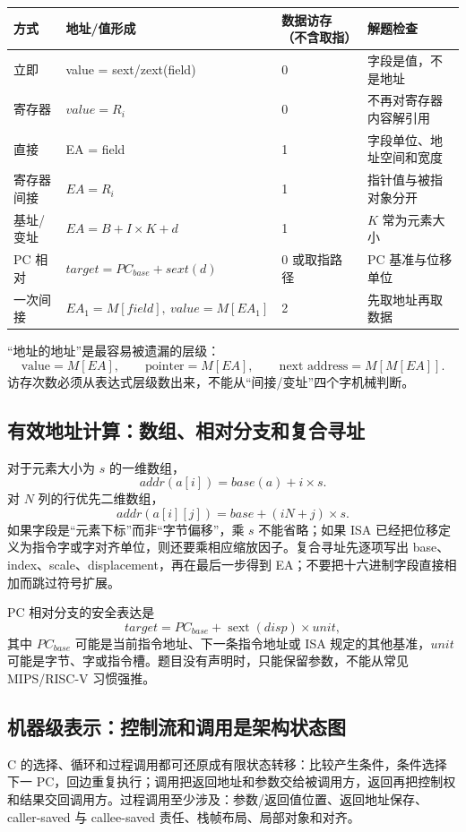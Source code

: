 \documentclass[UTF8,fontset=fandol,11pt,a4paper]{ctexart}
\begin{document}
\begin{center}\small
\begin{tabularx}{\linewidth}{L{2.2cm}L{3.3cm}C{1.0cm}Y}
\toprule
方式 & 地址/值形成 & 数据访存（不含取指） & 解题检查 \\
\midrule
立即 & value = sext/zext(field) & 0 & 字段是值，不是地址 \\
寄存器 & $value=R_i$ & 0 & 不再对寄存器内容解引用 \\
直接 & EA = field & 1 & 字段单位、地址空间和宽度 \\
寄存器间接 & $EA=R_i$ & 1 & 指针值与被指对象分开 \\
基址/变址 & $EA=B+I\times K+d$ & 1 & $K$ 常为元素大小 \\
PC 相对 & $target=PC_{base}+sext(d)$ & 0 或取指路径 & PC 基准与位移单位 \\
一次间接 & $EA_1=M[field],\ value=M[EA_1]$ & 2 & 先取地址再取数据 \\
\bottomrule
\end{tabularx}
\end{center}

“地址的地址”是最容易被遗漏的层级：
\[
\text{value}=M[EA],\qquad
\text{pointer}=M[EA],\qquad
\text{next address}=M[M[EA]].
\]
访存次数必须从表达式层级数出来，不能从“间接/变址”四个字机械判断。

\subsection{有效地址计算：数组、相对分支和复合寻址}

对于元素大小为 $s$ 的一维数组，
\[
addr(a[i])=base(a)+i\times s.
\]
对 $N$ 列的行优先二维数组，
\[
addr(a[i][j])=base+(iN+j)\times s.
\]
如果字段是“元素下标”而非“字节偏移”，乘 $s$ 不能省略；如果 ISA 已经把位移定义为指令字或字对齐单位，则还要乘相应缩放因子。复合寻址先逐项写出 base、index、scale、displacement，再在最后一步得到 EA；不要把十六进制字段直接相加而跳过符号扩展。

PC 相对分支的安全表达是
\[
target=PC_{base}+\operatorname{sext}(disp)\times unit,
\]
其中 $PC_{base}$ 可能是当前指令地址、下一条指令地址或 ISA 规定的其他基准，$unit$ 可能是字节、字或指令槽。题目没有声明时，只能保留参数，不能从常见 MIPS/RISC-V 习惯强推。

\subsection{机器级表示：控制流和调用是架构状态图}

C 的选择、循环和过程调用都可还原成有限状态转移：比较产生条件，条件选择下一 PC，回边重复执行；调用把返回地址和参数交给被调用方，返回再把控制权和结果交回调用方。过程调用至少涉及：参数/返回值位置、返回地址保存、caller-saved 与 callee-saved 责任、栈帧布局、局部对象和对齐。
\end{document}
